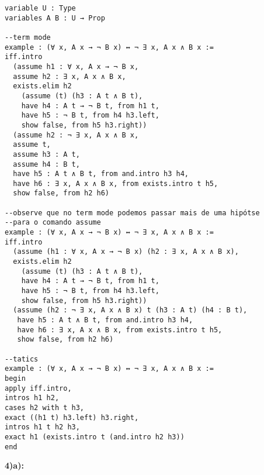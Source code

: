 \begin{lstlisting}
variable U : Type
variables A B : U → Prop 

--term mode
example : (∀ x, A x → ¬ B x) ↔ ¬ ∃ x, A x ∧ B x :=
iff.intro
  (assume h1 : ∀ x, A x → ¬ B x,
  assume h2 : ∃ x, A x ∧ B x,
  exists.elim h2
    (assume (t) (h3 : A t ∧ B t), 
    have h4 : A t → ¬ B t, from h1 t,
    have h5 : ¬ B t, from h4 h3.left,
    show false, from h5 h3.right))
  (assume h2 : ¬ ∃ x, A x ∧ B x,
  assume t, 
  assume h3 : A t,
  assume h4 : B t,
  have h5 : A t ∧ B t, from and.intro h3 h4,
  have h6 : ∃ x, A x ∧ B x, from exists.intro t h5,
  show false, from h2 h6)

--observe que no term mode podemos passar mais de uma hipótse
--para o comando assume
example : (∀ x, A x → ¬ B x) ↔ ¬ ∃ x, A x ∧ B x :=
iff.intro
  (assume (h1 : ∀ x, A x → ¬ B x) (h2 : ∃ x, A x ∧ B x),
  exists.elim h2
    (assume (t) (h3 : A t ∧ B t), 
    have h4 : A t → ¬ B t, from h1 t,
    have h5 : ¬ B t, from h4 h3.left,
    show false, from h5 h3.right))
  (assume (h2 : ¬ ∃ x, A x ∧ B x) t (h3 : A t) (h4 : B t),
   have h5 : A t ∧ B t, from and.intro h3 h4,
   have h6 : ∃ x, A x ∧ B x, from exists.intro t h5,
   show false, from h2 h6)  

--tatics
example : (∀ x, A x → ¬ B x) ↔ ¬ ∃ x, A x ∧ B x :=
begin
apply iff.intro,
intros h1 h2,
cases h2 with t h3,
exact ((h1 t) h3.left) h3.right,
intros h1 t h2 h3,
exact h1 (exists.intro t (and.intro h2 h3))
end

\end{lstlisting}
\textbf{4)a):}

